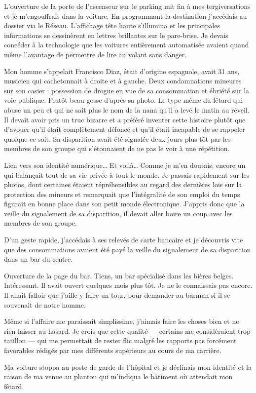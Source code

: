 L'ouverture de la porte de l'ascenseur sur le parking mit fin à mes tergiversations et je m'engouffrais dans la
voiture. En programmant la destination j'accédais au dossier via le Réseau. L'affichage tête haute s'illumina et les
principales informations se dessinèrent en lettres brillantes sur le pare-brise. Je devais concéder à la technologie
que les voitures entièrement automatisée avaient quand même l'avantage de permettre de lire au volant sans danger.

Mon homme s'appelait Francisco Diaz, était d'origine espagnole, avait 31 ans, musicien qui cachetonnait à droite et à
gauche. Deux condamnations mineures sur son casier : possession de drogue en vue de sa consommation et ébriété sur la
voie publique. Plutôt beau gosse d'après sa photo. Le type même du fêtard qui abuse un peu et qui ne sait plus le nom de
la nana qu'il a levé le matin au réveil. Il devait avoir pris un truc bizarre et a préféré inventer cette histoire
plutôt que d'avouer qu'il était complètement défoncé et qu'il était incapable de se rappeler quoique ce soit. Sa
disparition avait été signalée deux jours plus tôt par les membres de son groupe qui s'étonnaient de ne pas le voir à
une répétition.

Lien vers son identité numérique… Et voilà… Comme je m'en doutais, encore un qui balançait tout de sa vie privée à tout
le monde. Je passais rapidement sur les photos, dont certaines étaient répréhensibles au regard des dernières lois sur
la protection des mineurs et remarquait que l'intégralité de son emploi du temps figurait en bonne place dans son petit
monde électronique. J'appris donc que la veille du signalement de sa disparition, il devait aller boire un coup avec
les membres de son groupe.

D'un geste rapide, j'accédais à ses relevés de carte bancaire et je découvris vite que des consommations avaient été
payé la veille du signalement de sa disparition dans un bar du centre.

Ouverture de la page du bar. Tiens, un bar spécialisé dans les bières belges. Intéressant. Il avait ouvert quelques
mois plus tôt. Je ne le connaissais pas encore. Il allait falloir que j'aille y faire un tour, pour demander au barman
si il se souvenait de notre homme.

Même si l'affaire me paraissait simplissime, j'aimais faire les choses bien et ne rien laisser au hasard. Je crois que
cette qualité — certains me considéraient trop tatillon — qui me permettait de rester flic malgré les rapports pas
forcément favorables rédigés par mes différents supérieurs au cours de ma carrière.

Ma voiture stoppa au poste de garde de l'hôpital et je déclinais mon identité et la raison de ma venue au planton qui
m'indiqua le bâtiment où attendait mon fêtard.
